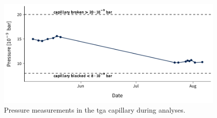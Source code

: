 \begin{figure}
	\includegraphics[width=\textwidth]{figures/tga-capillary-pressure}
	\caption{Pressure measurements in the \ac{tga} capillary during analyses.}
	\label{fig:tga-capillary-pressure}
\end{figure}
